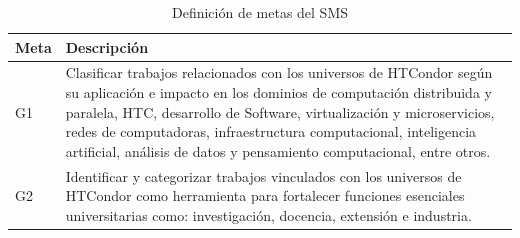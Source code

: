 \begin{table}[H]
	\centering
	\renewcommand{\arraystretch}{1.2} %
	\fontsize{9pt}{10pt}\selectfont %
	\begin{tabular}{|p{1.5cm}|p{12.5cm}|}  %
		\hline
		\textbf{Meta} & \textbf{Descripción}                                                                                                                                                                                                                                                                                                                                         \\ \hline
		G1            & Clasificar trabajos relacionados con los universos de HTCondor según su aplicación e impacto en los dominios de computación distribuida y paralela, HTC, desarrollo de Software, virtualización y microservicios, redes de computadoras, infraestructura computacional, inteligencia artificial, análisis de datos y pensamiento computacional, entre otros. \\ \hline
		G2            & Identificar y categorizar trabajos vinculados con los universos de HTCondor como herramienta para fortalecer funciones esenciales universitarias como: investigación, docencia, extensión e industria.                                                                                                                                                       \\ \hline
	\end{tabular}
	\caption{Definición de metas del SMS}
	\label{tab:metas}
\end{table}


